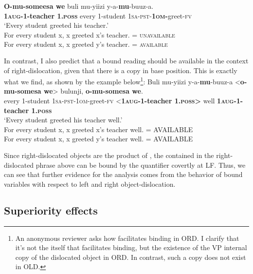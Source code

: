 \documentclass[output=paper
,newtxmath
,modfonts
,nonflat]{langsci/langscibook}
\begin{document}
\ea\label{ex:ranero:36}
\gll \textbf{O-mu-someesa  we}         buli    mu-yiizi   y-a-\textbf{mu}{}-buuz-a.\\
\textbf{1\textsc{aug}}\textbf{{}-1-teacher 1.}\textbf{\textsc{poss}} every 1-student \textsc{1sa-pst-}\textbf{\textsc{1om}}\textbf{{}-}greet-\textsc{fv}\\
\glt ‘Every student greeted his teacher.’\\ 
\-\hspace{1cm}For every student x, x greeted x’s teacher. = \textsc{unavailable}\\
\-\hspace{1cm}For every student x, x greeted y’s teacher. = \textsc{available}
\z

In contrast, I also predict that a bound reading should be available in the context of right-dislocation, given that there is a copy in base position. This is exactly what we find, as shown by the example below\footnote{An anonymous reviewer asks how  facilitates binding in ORD. I clarify that it’s not the  itself that facilitates binding, but the existence of the VP internal copy of the dislocated object in ORD. In contrast, such a copy does not exist in OLD.}:
\ea\label{ex:ranero:37}
\gll Buli   mu-yiizi  y-a-\textbf{mu}{}-buuz-a <\textbf{o-mu-somesa    we}> bulunji, \textbf{o-mu-somesa     we}.\\
every 1-student \textsc{1sa-pst-1om}{}-greet-\textsc{fv} <\textbf{1\textsc{aug}}\textbf{{}-1-teacher 1.}\textbf{\textsc{poss>}} well \textbf{1\textsc{aug}}\textbf{{}-1-teacher 1.}\textbf{\textsc{poss}}\\        
\glt ‘Every student greeted his teacher well.’ \\

\-\hspace{1cm}For every student x, x greeted x’s teacher well. = AVAILABLE\\
\-\hspace{1cm}For every student x, x greeted y’s teacher well. = AVAILABLE
\z

Since right-dislocated objects are the product of , the  contained in the right-dislocated phrase above can be bound by the quantifier  covertly at LF. Thus, we can see that further evidence for the analysis comes from the behavior of bound variables with respect to left and right object-dislocation.

\subsection{Superiority effects}\label{sec:ranero:5.3}
\end{document}
